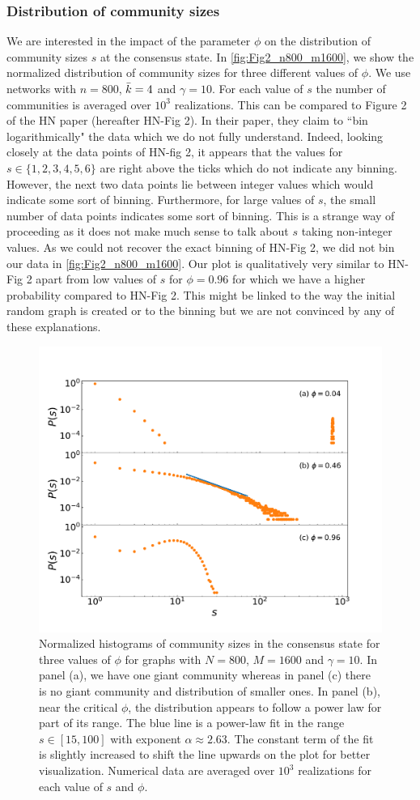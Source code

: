 \documentclass[11pt]{article}
\begin{document}
\subsubsection{Distribution of community sizes}
We are interested in the impact of the parameter $\phi$ on the distribution of community sizes $s$ at the consensus state. In \autoref{fig:Fig2_n800_m1600}, we show the normalized distribution of community sizes for three different values of $\phi$. We use networks with $n=800$, $\Bar{k}=4$ and $\gamma=10$. For each value of $s$ the number of communities is averaged over $10^3$ realizations. This can be compared to Figure 2 of the HN paper (hereafter HN-Fig 2). In their paper, they claim to ``bin logarithmically" the data which we do not fully understand. Indeed, looking closely at the data points of HN-fig 2, it appears that the values for $s\in\{1, 2, 3, 4, 5, 6\}$ are right above the ticks which do not indicate any binning. However, the next two data points lie between integer values which would indicate some sort of binning. Furthermore, for large values of $s$, the small number of data points indicates some sort of binning. This is a strange way of proceeding as it does not make much sense to talk about $s$ taking non-integer values. As we could not recover the exact binning of HN-Fig 2, we did not bin our data in \autoref{fig:Fig2_n800_m1600}. Our plot is qualitatively very similar to HN-Fig 2 apart from low values of $s$ for $\phi=0.96$ for which we have a higher probability compared to HN-Fig 2. This might be linked to the way the initial random graph is created or to the binning but we are not convinced by any of these explanations.
\begin{figure}[h]
    \centering
    \includegraphics[width=0.7\linewidth]{figures/Fig2_n800_m1600.pdf}
    \caption{Normalized histograms of community sizes in the consensus state for three values of $\phi$ for graphs with $N = 800$, $M = 1600$ and $\gamma=10$. In panel (a), we have one giant community whereas in panel (c) there is no giant community and distribution of smaller ones. In panel (b), near the critical $\phi$, the distribution appears to follow a power law for part of its range. The blue line is a power-law fit in the range $s\in[15, 100]$ with exponent $\alpha\approx2.63$. The constant term of the fit is slightly increased to shift the line upwards on the plot for better visualization. Numerical data are averaged over $10^3$ realizations for each value of $s$ and $\phi$.}
    \label{fig:Fig2_n800_m1600}
\end{figure}
\end{document}
